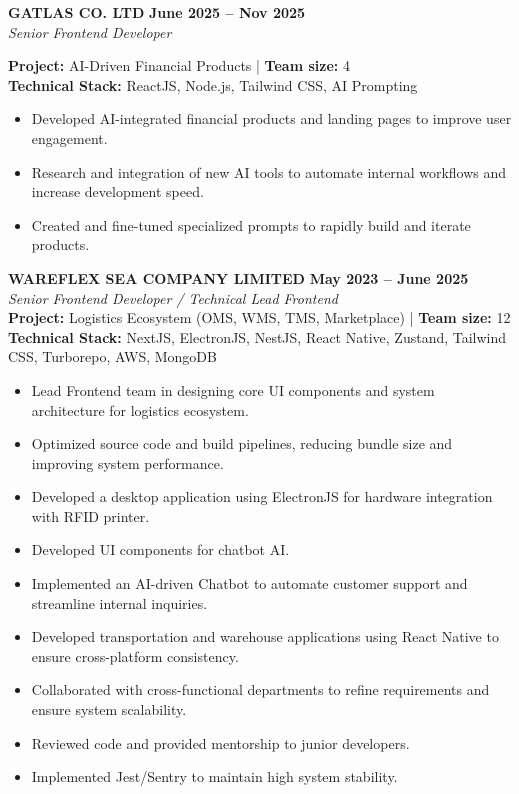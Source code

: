 \documentclass[11pt,a4paper]{article}
\begin{document}
\noindent \textbf{GATLAS CO. LTD} \hfill \textbf{June 2025 -- Nov 2025} \\
\textit{Senior Frontend Developer}

\noindent \textbf{Project:} AI-Driven Financial Products | \textbf{Team size:} 4 \\
\noindent \textbf{Technical Stack:} ReactJS, Node.js, Tailwind CSS, AI Prompting
\begin{itemize}
    \item Developed AI-integrated financial products and landing pages to improve user engagement.
    \item Research and integration of new AI tools to automate internal workflows and increase development speed.
    \item Created and fine-tuned specialized prompts to rapidly build and iterate products.
\end{itemize}

\vspace{8pt}

\noindent \textbf{WAREFLEX SEA COMPANY LIMITED} \hfill \textbf{May 2023 -- June 2025} \\
\textit{Senior Frontend Developer / Technical Lead Frontend} \\
\noindent \textbf{Project:}  Logistics Ecosystem (OMS, WMS, TMS, Marketplace) | \textbf{Team size:} 12 \\
\noindent \textbf{Technical Stack:} NextJS, ElectronJS, NestJS, React Native, Zustand, Tailwind CSS, Turborepo, AWS, MongoDB
\begin{itemize}
    \item Lead Frontend team in designing core UI components and system architecture for logistics ecosystem.
    \item Optimized source code and build pipelines, reducing bundle size and improving system performance.
    \item Developed a desktop application using ElectronJS for hardware integration with RFID printer.
    \item Developed UI components for chatbot AI.
    \item Implemented an AI-driven Chatbot to automate customer support and streamline internal inquiries.
    \item Developed transportation and warehouse applications using React Native to ensure cross-platform consistency.
    \item Collaborated with cross-functional departments to refine requirements and ensure system scalability.
    \item Reviewed code and provided mentorship to junior developers.
    \item Implemented Jest/Sentry to maintain high system stability.
\end{itemize}
\end{document}
